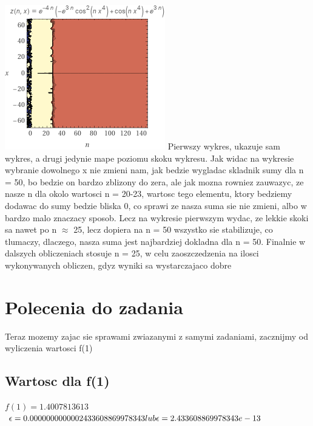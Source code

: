 \documentclass[a4paper,8pt]{article}
\begin{document}
\newline
\includegraphics{mapa}
\newline
Pierwszy wykres, ukazuje sam wykres, a drugi jedynie mape poziomu skoku wykresu. Jak widac na wykresie wybranie dowolnego x nie zmieni nam, jak bedzie wygladac skladnik sumy dla n = 50, bo bedzie on bardzo zblizony do zera, ale jak mozna rowniez zauwazyc, ze nasze n dla okolo wartosci n = 20-23, wartosc tego elementu, ktory bedziemy dodawac do sumy bedzie bliska 0, co sprawi ze nasza suma sie nie zmieni, albo w bardzo malo znaczacy sposob. Lecz na wykresie pierwszym wydac, ze lekkie skoki sa nawet po n $\approx$ 25, lecz dopiera na n = 50 wszystko sie stabilizuje, co tlumaczy, dlaczego, nasza suma jest najbardziej dokladna dla n = 50. Finalnie w dalszych obliczeniach stosuje n = 25, w celu zaoszczedzenia na ilosci wykonywanych obliczen, gdyz wyniki sa wystarczajaco dobre

\section{Polecenia do zadania}
Teraz mozemy zajac sie sprawami zwiazanymi z samymi zadaniami, zacznijmy od wyliczenia wartosci f(1)

\subsection*{Wartosc dla f(1)}
$f(1) = 1.4007813613$
\newline
$\epsilon = 0.0000000000002433608869978343 \newline lub \newline\epsilon = 2.433608869978343e-13$
\newpage
\end{document}
